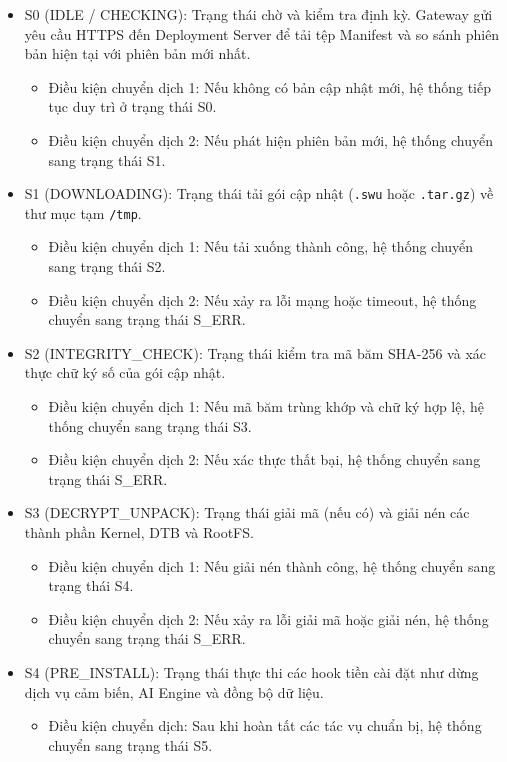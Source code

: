 \begin{itemize}
    \item S0 (IDLE / CHECKING): Trạng thái chờ và kiểm tra định kỳ. Gateway gửi yêu cầu HTTPS đến Deployment Server để tải tệp Manifest và so sánh phiên bản hiện tại với phiên bản mới nhất.
    \begin{itemize}
        \item Điều kiện chuyển dịch 1: Nếu không có bản cập nhật mới, hệ thống tiếp tục duy trì ở trạng thái S0.
        \item Điều kiện chuyển dịch 2: Nếu phát hiện phiên bản mới, hệ thống chuyển sang trạng thái S1.
    \end{itemize}

    \item S1 (DOWNLOADING): Trạng thái tải gói cập nhật (\texttt{.swu} hoặc \texttt{.tar.gz}) về thư mục tạm \texttt{/tmp}.
    \begin{itemize}
        \item Điều kiện chuyển dịch 1: Nếu tải xuống thành công, hệ thống chuyển sang trạng thái S2.
        \item Điều kiện chuyển dịch 2: Nếu xảy ra lỗi mạng hoặc timeout, hệ thống chuyển sang trạng thái S\_ERR.
    \end{itemize}

    \item S2 (INTEGRITY\_CHECK): Trạng thái kiểm tra mã băm SHA-256 và xác thực chữ ký số của gói cập nhật.
    \begin{itemize}
        \item Điều kiện chuyển dịch 1: Nếu mã băm trùng khớp và chữ ký hợp lệ, hệ thống chuyển sang trạng thái S3.
        \item Điều kiện chuyển dịch 2: Nếu xác thực thất bại, hệ thống chuyển sang trạng thái S\_ERR.
    \end{itemize}

    \item S3 (DECRYPT\_UNPACK): Trạng thái giải mã (nếu có) và giải nén các thành phần Kernel, DTB và RootFS.
    \begin{itemize}
        \item Điều kiện chuyển dịch 1: Nếu giải nén thành công, hệ thống chuyển sang trạng thái S4.
        \item Điều kiện chuyển dịch 2: Nếu xảy ra lỗi giải mã hoặc giải nén, hệ thống chuyển sang trạng thái S\_ERR.
    \end{itemize}

    \item S4 (PRE\_INSTALL): Trạng thái thực thi các hook tiền cài đặt như dừng dịch vụ cảm biến, AI Engine và đồng bộ dữ liệu.
    \begin{itemize}
        \item Điều kiện chuyển dịch: Sau khi hoàn tất các tác vụ chuẩn bị, hệ thống chuyển sang trạng thái S5.
    \end{itemize}


\end{itemize}
